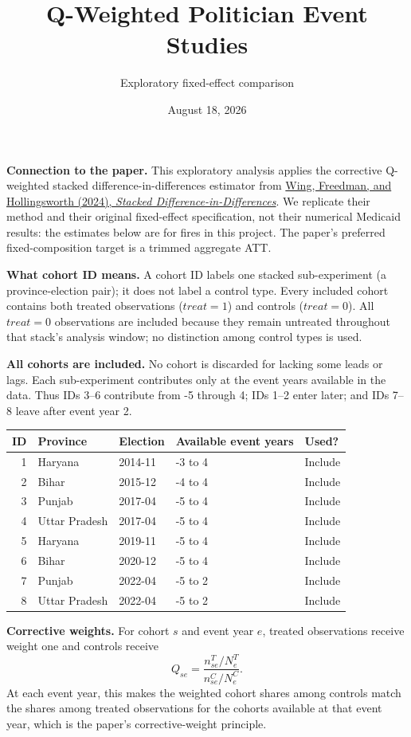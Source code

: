 \documentclass[10pt]{article}
\title{Q-Weighted Politician Event Studies}
\author{Exploratory fixed-effect comparison}
\date{August 18, 2026}
\begin{document}
\maketitle
\textbf{Connection to the paper.} This exploratory analysis applies the 
corrective Q-weighted stacked difference-in-differences estimator from 
\href{https://doi.org/10.3386/w32054}{Wing, Freedman, and Hollingsworth 
(2024), \textit{Stacked Difference-in-Differences}}. We replicate their 
method and their original fixed-effect specification, not their numerical 
Medicaid results: the estimates below are for fires in this project. The 
paper's preferred fixed-composition target is a trimmed aggregate ATT.

\textbf{What cohort ID means.} A cohort ID labels one stacked 
sub-experiment (a province-election pair); it does not label a control type. 
Every included cohort contains both treated observations ($treat=1$) and 
controls ($treat=0$). All $treat=0$ observations are included because they 
remain untreated throughout that stack's analysis window; no distinction 
among control types is used.

\textbf{All cohorts are included.} No cohort is discarded for lacking 
some leads or lags. Each sub-experiment contributes only at the event years 
available in the data. Thus IDs 3--6 contribute from -5 through 4; IDs 1--2 
enter later; and IDs 7--8 leave after event year 2.
\begin{center}
\small
\begin{tabular}{rllll}
\toprule
ID & Province & Election & Available event years & Used? \\
\midrule
1 & Haryana & 2014-11 & -3 to 4 & Include \\
2 & Bihar & 2015-12 & -4 to 4 & Include \\
3 & Punjab & 2017-04 & -5 to 4 & Include \\
4 & Uttar Pradesh & 2017-04 & -5 to 4 & Include \\
5 & Haryana & 2019-11 & -5 to 4 & Include \\
6 & Bihar & 2020-12 & -5 to 4 & Include \\
7 & Punjab & 2022-04 & -5 to 2 & Include \\
8 & Uttar Pradesh & 2022-04 & -5 to 2 & Include \\
\bottomrule
\end{tabular}
\end{center}
\textbf{Corrective weights.} For cohort $s$ and event year $e$, treated 
observations receive weight one and controls receive
\[Q_{se}=\frac{n^T_{se}/N^T_e}{n^C_{se}/N^C_e}.\]
At each event year, this makes the weighted cohort shares among controls 
match the shares among treated observations for the cohorts available at 
that event year, which is the paper's corrective-weight principle.
\end{document}
